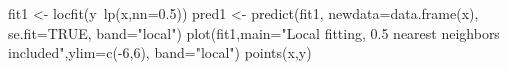 \begin{Schunk}
\begin{Sinput}
 fit1 <- locfit(y~lp(x,nn=0.5)) 
 pred1 <- predict(fit1, newdata=data.frame(x), se.fit=TRUE, band="local")
 plot(fit1,main="Local fitting, 0.5 nearest neighbors included",ylim=c(-6,6), band="local")
 points(x,y)
\end{Sinput}
\end{Schunk}
